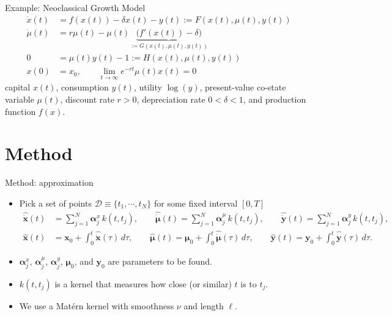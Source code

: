 \documentclass[aspectratio=169,10pt]{beamer}
\newcommand{\bx}{\mathbf{x}}
\newcommand{\by}{\mathbf{y}}
\newcommand{\bmu}{\boldsymbol{\mu}}
\newcommand{\balpha}{\boldsymbol{\alpha}}
\begin{document}
\begin{frame}{Example: Neoclassical Growth Model}
	\[
	\begin{aligned}
		\dot{x}(t) &= f(x(t)) - \delta x(t) - y(t)
		:= F(x(t), \mu(t), y(t)) \\[4pt]
		\dot{\mu}(t) &= r \mu(t) - \mu(t)
		\underbrace{\big(f'(x(t)) - \delta\big)}_{:= G(x(t), \mu(t), y(t))} \\[4pt]
		0 &= \mu(t)y(t) - 1
		:= H(x(t), \mu(t), y(t)) \\[6pt]
		x(0) &= x_0, \qquad
		\lim_{t \to \infty} e^{-rt} \mu(t) x(t) = 0
	\end{aligned}
	\]
	capital $x(t)$, consumption $y(t)$, utility $\log(y)$, present-value co-state variable $\mu(t)$, discount rate $r > 0$, depreciation rate $0 < \delta < 1$, and production function
	$f(x)$.
\end{frame}


\section{Method}

\begin{frame}{Method: approximation}
	\label{kernel-approax}
	\begin{itemize}
		\item Pick a set of points $\mathcal{D}\equiv \{t_1,\cdots,t_N\}$ for some fixed interval $[0,T]$
		\vspace{0.1in}
		\[
		\begin{aligned}
			\hat{\dot{\bx}}(t) &= \sum_{j=1}^N \balpha^x_j\, k(t,t_j), \qquad
			\hat{\dot{\bmu}}(t) = \sum_{j=1}^N \balpha^\mu_j\, k(t,t_j), \qquad
			\hat{\dot{\by}}(t) = \sum_{j=1}^N \balpha^y_j\, k(t,t_j), \\[6pt]
			\hat{\bx}(t) &= \bx_0 + \int_0^t \hat{\dot{\bx}}(\tau)\, d\tau, \qquad
			\hat{\bmu}(t) = \bmu_0 + \int_0^t \hat{\dot{\bmu}}(\tau)\, d\tau, \qquad
			\hat{\by}(t) = \by_0 + \int_0^t \hat{\dot{\by}}(\tau)\, d\tau.
		\end{aligned}
		\]
	\item $\balpha^x_j$, $\balpha^\mu_j$, $\balpha^y_j$, $\bmu_0$, and $\by_0$ are parameters to be found.
	 \vspace{0.1in}
	\item $k(t,t_j)$ is a kernel that measures how close (or similar) $t$ is to $t_j$.
	\vspace{0.1in}
	\item We use a Matérn kernel with smoothness $\nu$ and length $\ell$. \\ \hyperlink{Maten-def}{}
	\vspace{0.1in}
	\end{itemize}
\end{frame}
\end{document}
